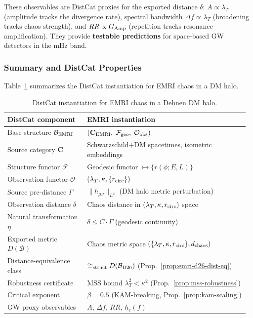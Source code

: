 \documentclass[
]{article}
\begin{document}
These observables are DistCat proxies for the exported distance $\delta$: $A \propto \lambda_T$ (amplitude tracks the divergence rate), spectral bandwidth $\Delta f \propto \lambda_T$ (broadening tracks chaos strength), and $RR \propto G_{\rm Amp}$ (repetition tracks resonance amplification). They provide \textbf{testable predictions} for space-based GW detectors in the mHz band.

\subsubsection{Summary and DistCat Properties}\label{subsec:emri-summary}

Table~\ref{tab:emri-distcat} summarizes the DistCat instantiation for EMRI chaos in a DM halo.

\begin{table}[t]
\centering
\begin{tabular}{@{} >{\raggedright\arraybackslash}p{0.32\linewidth} >{\raggedright\arraybackslash}p{0.65\linewidth}@{}}
\toprule
\textbf{DistCat component} & \textbf{EMRI instantiation} \\
\midrule
Base structure $\mathcal{B}_{\rm EMRI}$ & $(\mathbf{C}_{\rm EMRI},\; \mathcal{F}_{\rm geo},\; \mathcal{O}_{\rm obs})$ \\
Source category $\mathbf{C}$ & Schwarzschild+DM spacetimes, isometric embeddings \\
Structure functor $\mathcal{F}$ & Geodesic functor $\mapsto \{r(\phi; E,L)\}$ \\
Observation functor $\mathcal{O}$ & $(\lambda_T, \kappa, \{r_{\rm circ}\})$ \\
Source pre-distance $\Gamma$ & $\|h_{\mu\nu}\|_{L^2}$ (DM halo metric perturbation) \\
Observation distance $\delta$ & Chaos distance in $(\lambda_T, \kappa, r_{\rm circ})$ space \\
Natural transformation $\eta$ & $\delta \leq C \cdot \Gamma$ (geodesic continuity) \\
Exported metric $D(\mathcal{B})$ & Chaos metric space $(\{\lambda_T, \kappa, r_{\rm circ}\}, d_{\rm chaos})$ \\
Distance-equivalence class & $\cong_{\rm struct} D(\mathcal{B}_{\rm D26})$ (Prop.~\ref{prop:emri-d26-dist-eq}) \\
Robustness certificate & MSS bound $\lambda_T^2 < \kappa^2$ (Prop.~\ref{prop:mss-robustness}) \\
Critical exponent & $\beta = 0.5$ (KAM-breaking, Prop.~\ref{prop:kam-scaling}) \\
GW proxy observables & $A$, $\Delta f$, $RR$, $h_c(f)$ \\
\bottomrule
\end{tabular}
\caption{DistCat instantiation for EMRI chaos in a Dehnen DM halo.}
\label{tab:emri-distcat}
\end{table}
\end{document}
